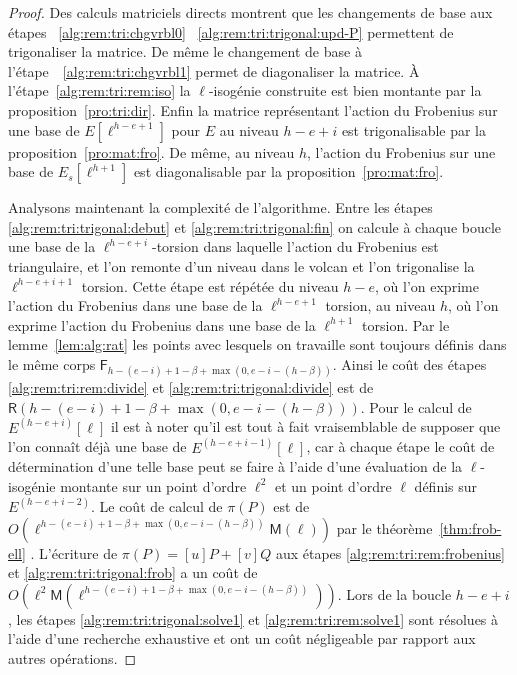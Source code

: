 \documentclass[10pt,a4paper]{book}
\theoremstyle{plain}
\theoremstyle{definition}
\theoremstyle{definition}
\theoremstyle{definition}
\theoremstyle{definition}
\theoremstyle{definition}
\theoremstyle{remark}
\theoremstyle{remark}
\theoremstyle{definition}
\begin{document}
\begin{proof}
Des calculs matriciels directs montrent que les changements de base aux étapes
 ~\ref{alg:rem:tri:chgvrbl0} ~\ref{alg:rem:tri:trigonal:upd-P} permettent de 
trigonaliser la matrice. De même le changement de base à 
l'étape~~\ref{alg:rem:tri:chgvrbl1} permet de diagonaliser la matrice.
\`A l'étape~\ref{alg:rem:tri:rem:iso} la $\ell$-isogénie construite est bien 
montante par la proposition~\ref{pro:tri:dir}. Enfin la matrice représentant
l'action du Frobenius sur une base de $E[\ell^{h-e+1}]$ pour $E$ au niveau 
$h-e+i$ est trigonalisable par la proposition~\ref{pro:mat:fro}. De même, au 
niveau $h$, l'action du Frobenius sur une base de $E_s[\ell^{h+1}]$ est 
diagonalisable par la proposition~\ref{pro:mat:fro}.
 
Analysons maintenant la complexité de l'algorithme. 
Entre les étapes \ref{alg:rem:tri:trigonal:debut} et \ref{alg:rem:tri:trigonal:fin}
on calcule à chaque boucle une base de la $\ell^{h-e+i}$-torsion dans laquelle
l'action du Frobenius est triangulaire, et l'on remonte d'un niveau dans le 
volcan et l'on trigonalise la $\ell^{h-e+i+1}$ torsion. Cette étape est répétée
du niveau $h-e$, où l'on exprime
l'action du Frobenius dans une base de la $\ell^{h-e+1}$ torsion, au niveau $h$, 
où l'on exprime l'action du Frobenius dans une base de la $\ell^{h+1}$ torsion.
Par le lemme~\ref{lem:alg:rat} les points avec lesquels on travaille sont 
toujours définis dans le même corps $\mathsf{F}_{h-(e-i)+1-\beta+\max(0,e-i-
(h-\beta))}$. Ainsi le coût des étapes \ref{alg:rem:tri:rem:divide} et 
\ref{alg:rem:tri:trigonal:divide} est de $\mathsf{R}(h-(e-i)+1-\beta+\max(0,e-i
-(h-\beta)))$. Pour le calcul de $E^{(h-e+i)}[\ell]$ il est à noter qu'il est 
tout à fait vraisemblable de supposer que l'on connaît déjà une base de 
$E^{(h-e+i-1)}[\ell]$, car à chaque étape le coût de détermination d'une telle 
base peut se faire à l'aide d'une évaluation de la $\ell$-isogénie montante sur
un point d'ordre $\ell^2$ et un point d'ordre $\ell$ définis sur 
 $E^{(h-e+i-2)}$. Le coût de calcul de $\pi(P)$ est de $O(\ell^{h-(e-i)+1
-\beta +\max(0,e-i-(h-\beta))}\mathsf{M}(\ell))$ par le 
théorème~\ref{thm:frob-ell} . L'écriture de $\pi(P)=[u]P+[v]Q$ 
aux étapes \ref{alg:rem:tri:rem:frobenius} et \ref{alg:rem:tri:trigonal:frob} a
un coût de $O(\ell^2 \mathsf{M}(\ell^{h-(e-i)+1-\beta+\max(0,e-i-(h-\beta))}))$. 
Lors de la boucle $h-e+i$, les étapes \ref{alg:rem:tri:trigonal:solve1} et 
\ref{alg:rem:tri:rem:solve1} sont résolues à l'aide d'une recherche exhaustive 
et ont un coût négligeable par rapport aux autres opérations. 



\end{proof}
\end{document}
